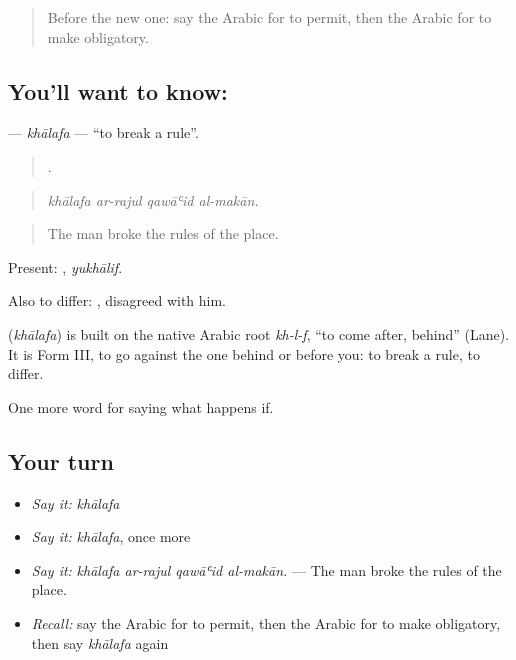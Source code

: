 \label{lesson:AR-C410-khalafa}



\begin{quote}
Before the new one: say the Arabic for to permit, then the Arabic for to make obligatory.
\end{quote}

\subsection*{You'll want to know: }
\textbf{} — \emph{khālafa} — \textquotedblleft{}to break a rule\textquotedblright{}.

\begin{quote}
   .
\end{quote}

\begin{quote}
\emph{khālafa ar-rajul qawāʿid al-makān.}
\end{quote}

\begin{quote}
The man broke the rules of the place.
\end{quote}

Present: , \emph{yukhālif}.

Also to differ:  , disagreed with him.

\begin{cousinweb}
\textbf{} (\emph{khālafa}) is built on the native Arabic root \emph{kh-l-f}, \textquotedblleft{}to come after, behind\textquotedblright{} (Lane). It is Form III, to go against the one behind or before you: to break a rule, to differ.
\end{cousinweb}

\begin{grammarlens}[title={What you've built}]
One more word for saying what happens if.
\end{grammarlens}

\subsection*{Your turn}
\begin{itemize}
\raggedright
  \item \emph{Say it:} \emph{khālafa}
  \item \emph{Say it:} \emph{khālafa}, once more
  \item \emph{Say it:} \emph{khālafa ar-rajul qawāʿid al-makān.} — The man broke the rules of the place.
  \item \emph{Recall:} say the Arabic for to permit, then the Arabic for to make obligatory, then say \emph{khālafa} again
\end{itemize}

